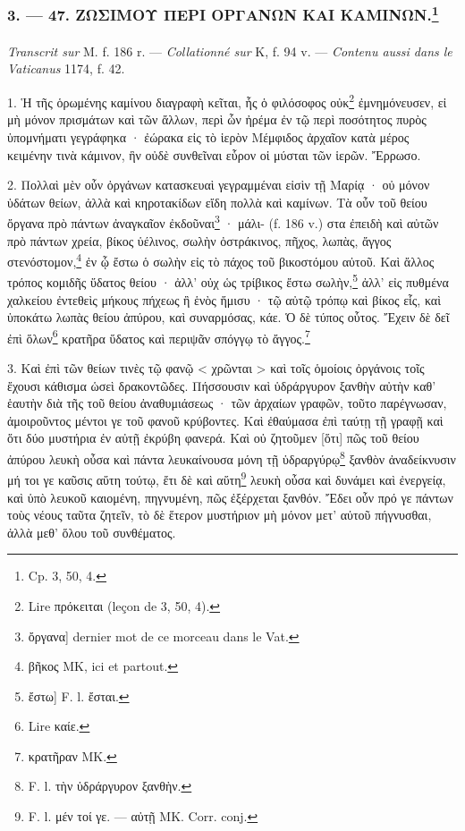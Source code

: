 \documentclass[landscape, a4paper, 11pt, oneside, polutonikogreek, french]{article}
\begin{document}
\bigskip
\centerline{\EightStarTaper}
\centerline{\EightStarTaper\EightStarTaper}
\bigskip

\subsubsection[3. --- 47. ΖΩΣΙΜΟΥ ΠΕΡΙ ΟΡΓΑΝΩΝ ΚΑΙ ΚΑΜΙΝΩΝ.]{3. --- 47. ΖΩΣΙΜΟΥ ΠΕΡΙ ΟΡΓΑΝΩΝ ΚΑΙ ΚΑΜΙΝΩΝ.\footnote{Cp. 3, 50, 4.}}
\paragraph{}
\emph{Transcrit sur} M. f. 186 r. --- \emph{Collationné sur} K, f. 94 v. --- \emph{Contenu aussi dans le Vaticanus} 1174, f. 42.

\bigskip

1. Ἡ τῆς ὁρωμένης καμίνου διαγραφὴ κεῖται, ἧς ὁ φιλόσοφος οὐκ\footnote{Lire πρόκειται (leçon de 3, 50, 4).} ἐμνημόνευσεν, εἰ μὴ μόνον πρισμάτων καὶ τῶν ἄλλων, περὶ ὧν ἠρέμα ἐν τῷ περὶ ποσότητος πυρὸς ὑπομνήματι γεγράφηκα · ἐώρακα εἰς τὸ ἱερὸν Μέμφιδος ἀρχαῖον κατὰ μέρος κειμένην τινὰ κάμινον, ἣν οὐδὲ συνθεῖναι εὗρον οἱ μύσται τῶν ἱερῶν. Ἔρρωσο.

2. Πολλαὶ μὲν οὖν ὀργάνων κατασκευαὶ γεγραμμέναι εἰσὶν τῇ Μαρίᾳ · οὐ μόνον ὑδάτων θείων, ἀλλὰ καὶ κηροτακίδων εἴδη πολλὰ καὶ καμίνων. Τὰ οὖν τοῦ θείου ὄργανα πρὸ πάντων ἀναγκαῖον ἐκδοῦναι\footnote{ὄργανα] dernier mot de ce morceau dans le Vat.} · μάλι- (f. 186 v.) στα ἐπειδὴ καὶ αὐτῶν πρὸ πάντων χρεία, βίκος ὑέλινος, σωλὴν ὀστράκινος, πῆχος, λωπὰς, ἄγγος στενόστομον,\footnote{βῆκος MK, ici et partout.} ἐν ᾧ ἔστω ὁ σωλὴν εἰς τὸ πάχος τοῦ βικοστόμου αὐτοῦ. Καὶ ἄλλος τρόπος κομιδῆς ὕδατος θείου · ἀλλ' οὐχ ὡς τρίβικος ἔστω σωλὴν,\footnote{ἔστω] F. l. ἔσται.} ἀλλ' εἰς πυθμένα χαλκείου ἐντεθεὶς μήκους πήχεως ἢ ἑνὸς ἥμισυ · τῷ αὐτῷ τρόπῳ καὶ βίκος εἷς, καὶ ὑποκάτω λωπὰς θείου ἀπύρου, καὶ συναρμόσας, κάε. Ὁ δὲ τύπος οὗτος. Ἔχειν δὲ δεῖ ἐπὶ ὅλων\footnote{Lire καίε.} κρατῆρα ὕδατος καὶ περιψᾶν σπόγγῳ τὸ ἄγγος.\footnote{κρατῆραν MK.}

3. Καὶ ἐπὶ τῶν θείων τινὲς τῷ φανῷ < χρῶνται > καὶ τοῖς ὁμοίοις ὀργάνοις τοῖς ἔχουσι κάθισμα ὡσεὶ δρακοντῶδες. Πήσσουσιν καὶ ὑδράργυρον ξανθὴν αὐτὴν καθ' ἑαυτὴν διὰ τῆς τοῦ θείου ἀναθυμιάσεως · τῶν ἀρχαίων γραφῶν, τοῦτο παρέγνωσαν, ἀμοιροῦντος μέντοι γε τοῦ φανοῦ κρύβοντες. Καὶ ἐθαύμασα ἐπὶ ταύτῃ τῇ γραφῇ καὶ ὅτι δύο μυστήρια ἐν αὐτῇ ἐκρύβη φανερά. Καὶ οὐ ζητοῦμεν [ὅτι] πῶς τοῦ θείου ἀπύρου λευκὴ οὖσα καὶ πάντα λευκαίνουσα μόνη τῇ ὑδραργύρῳ\footnote{F. l. τὴν ὑδράργυρον ξανθὴν.} ξανθὸν ἀναδείκνυσιν μή τοι γε καῦσις αὕτη τούτῳ, ἔτι δὲ καὶ αὕτη\footnote{F. l. μέν τοί γε. --- αὐτῇ MK. Corr. conj.} λευκὴ οὖσα καὶ δυνάμει καὶ ἐνεργείᾳ, καὶ ὑπὸ λευκοῦ καιομένη, πηγνυμένη, πῶς ἐξέρχεται ξανθόν. Ἔδει οὖν πρό γε πάντων τοὺς νέους ταῦτα ζητεῖν, τὸ δὲ ἕτερον μυστήριον μὴ μόνον μετ' αὐτοῦ πήγνυσθαι, ἀλλὰ μεθ' ὅλου τοῦ συνθέματος.
\end{document}
